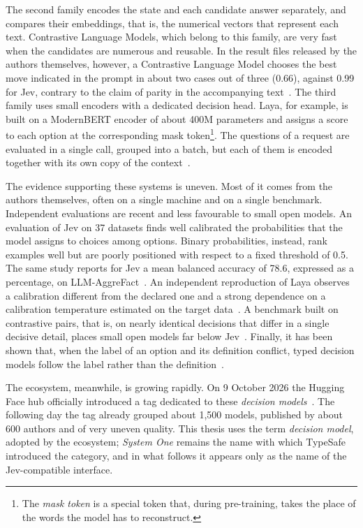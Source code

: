 The second family encodes the state and each candidate answer separately, and compares their embeddings, that is, the
numerical vectors that represent each text. Contrastive Language Models, which belong to this family, are very fast
when the candidates are numerous and reusable. In the result files released by the authors themselves, however, a Contrastive Language Model chooses the best move indicated in the prompt in about two cases out of three (0.66), against 0.99 for Jev, contrary to the claim of parity in the accompanying text~\cite{kwok2026clm}. The third family uses small encoders with a dedicated decision head. Laya, for example, is built on a ModernBERT encoder of about 400M parameters and assigns a score to each option at the corresponding mask token\footnote{The \emph{mask token} is a special token that, during pre-training, takes the place of the words the model has to reconstruct.}. The
questions of a request are evaluated in a single call, grouped into a batch, but each of them is encoded together with
its own copy of the context~\cite{convai2026laya,azizi2026labels}.

The evidence supporting these systems is uneven. Most of it comes from the authors themselves, often on a single machine
and on a single benchmark. Independent evaluations are recent and less favourable to small open models. An evaluation of
Jev on 37 datasets finds well calibrated the probabilities that the model assigns to choices among options. Binary
probabilities, instead, rank examples well but are poorly positioned with respect to a fixed threshold of 0.5. The same
study reports for Jev a mean balanced accuracy of 78.6, expressed as a percentage, on LLM-AggreFact~\cite{deusser2026jev}. An independent reproduction of Laya observes a calibration different from the
declared one and a strong dependence on a calibration temperature estimated on the target
data~\cite{nandakishore2026laya}. A benchmark built on contrastive pairs, that is, on nearly identical decisions that
differ in a single decisive detail, places small open models far below Jev~\cite{yong2026decidebench}. Finally, it has
been shown that, when the label of an option and its definition conflict, typed decision models follow the label rather
than the definition~\cite{azizi2026labels}.

The ecosystem, meanwhile, is growing rapidly. On 9 October 2026 the Hugging Face hub officially introduced a tag
dedicated to these \emph{decision models}~\cite{hf2026decisionmodels}. The following day the tag already grouped about
1{,}500 models, published by about 600 authors and of very uneven quality. This thesis uses the term \emph{decision
model}, adopted by the ecosystem; \emph{System One} remains the name with which TypeSafe introduced the category, and in
what follows it appears only as the name of the Jev-compatible interface.

